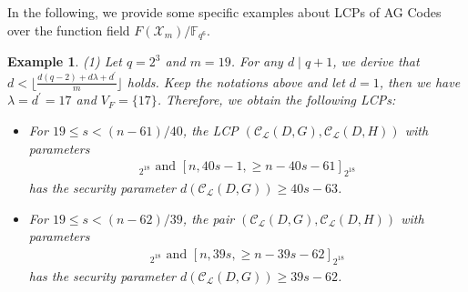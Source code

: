 \documentclass[journal,12pt,onecolumn]{IEEEtran}
\newtheorem{example}[theorem]{Example}
\newtheorem{remark}[theorem]{Remark}
\begin{document}


In the following, we provide some specific examples about LCPs of AG Codes over the function field $F(\mathcal{X}_m)/\mathbb{F}_{q^6}$.


\begin{example}\label{LCP_Xm_ex}
    {\rm (1)} Let $q=2^3$ and $m=19$. For any $d\mid q+1$, we derive that $d< \big\lfloor \frac{d(q-2)+d\lambda+d^\prime}{m} \big\rfloor$ holds. Keep the notations above and let $d = 1$, then we have $\lambda = d^\prime = 17$ and $V_F = \{ 17 \}$. Therefore, we obtain the following LCPs:
    \begin{itemize}
        \item For $19\le s <(n-61)/40$, the LCP $(\mathcal{C}_{\mathcal{L}}(D,G),\mathcal{C}_{\mathcal{L}}(D,H))$ with parameters
        \begin{gather*}
            [n,n-40s+1,\ge 40s-63]_{2^{18}}\text{ and }[n,40s-1,\ge n-40s-61]_{2^{18}}
        \end{gather*}
        has the security parameter $d(\mathcal{C}_{\mathcal{L}}(D,G))\ge 40s-63$.
        \item For $19\le s <(n-62)/39$, the pair $(\mathcal{C}_{\mathcal{L}}(D,G),\mathcal{C}_{\mathcal{L}}(D,H))$ with parameters
        \begin{gather*}
            [n,n-39s,\ge 39s-62]_{2^{18}}\text{ and }[n,39s,\ge n-39s-62]_{2^{18}}
        \end{gather*}
        has the security parameter $d(\mathcal{C}_{\mathcal{L}}(D,G))\ge 39s-62$.
    \end{itemize}


\end{example}
\end{document}
